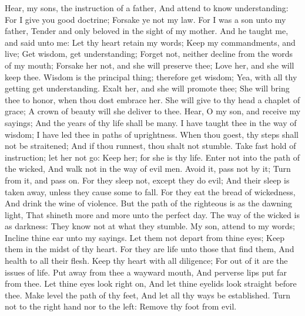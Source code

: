 Hear, my sons, the instruction of a father, And attend to know understanding:  For I give you good doctrine; Forsake ye not my law.  For I was a son unto my father, Tender and only beloved in the sight of my mother.  And he taught me, and said unto me: Let thy heart retain my words; Keep my commandments, and live;  Get wisdom, get understanding; Forget not, neither decline from the words of my mouth;  Forsake her not, and she will preserve thee; Love her, and she will keep thee.  Wisdom is the principal thing; therefore get wisdom; Yea, with all thy getting get understanding.  Exalt her, and she will promote thee; She will bring thee to honor, when thou dost embrace her.  She will give to thy head a chaplet of grace; A crown of beauty will she deliver to thee.  Hear, O my son, and receive my sayings; And the years of thy life shall be many.  I have taught thee in the way of wisdom; I have led thee in paths of uprightness.  When thou goest, thy steps shall not be straitened; And if thou runnest, thou shalt not stumble.  Take fast hold of instruction; let her not go: Keep her; for she is thy life.  Enter not into the path of the wicked, And walk not in the way of evil men.  Avoid it, pass not by it; Turn from it, and pass on.  For they sleep not, except they do evil; And their sleep is taken away, unless they cause some to fall.  For they eat the bread of wickedness, And drink the wine of violence.  But the path of the righteous is as the dawning light, That shineth more and more unto the perfect day.  The way of the wicked is as darkness: They know not at what they stumble.  My son, attend to my words; Incline thine ear unto my sayings.  Let them not depart from thine eyes; Keep them in the midst of thy heart.  For they are life unto those that find them, And health to all their flesh.  Keep thy heart with all diligence; For out of it are the issues of life.  Put away from thee a wayward mouth, And perverse lips put far from thee.  Let thine eyes look right on, And let thine eyelids look straight before thee.  Make level the path of thy feet, And let all thy ways be established.  Turn not to the right hand nor to the left: Remove thy foot from evil. 

